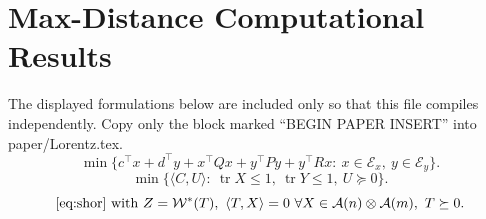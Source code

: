\documentclass[11pt]{article}
\providecommand{\Ecal}{\mathcal{E}}
\begin{document}
\section*{Max-Distance Computational Results}

The displayed formulations below are included only so that this file compiles
independently.  Copy only the block marked ``BEGIN PAPER INSERT'' into
paper/Lorentz.tex.
\begin{equation}
\label{eq:quadratic}
\min\{c^\top x+d^\top y+x^\top Qx+y^\top Py+y^\top Rx:\ x\in\Ecal_x,\ y\in\Ecal_y\}.
\end{equation}
\begin{equation}
\label{eq:shor}
\min\{\langle C,U\rangle:\ \operatorname{tr}X\le 1,\ \operatorname{tr}Y\le 1,\ U\succeq 0\}.
\end{equation}
\begin{equation}
\label{eq:fullsep}
\eqref{eq:shor}\ \text{with}\ Z=\mathcal{W}^*(T),\ \langle T,X\rangle=0\ \forall X\in\mathcal{A}(n)\otimes\mathcal{A}(m),\ T\succeq 0.
\end{equation}
\end{document}
